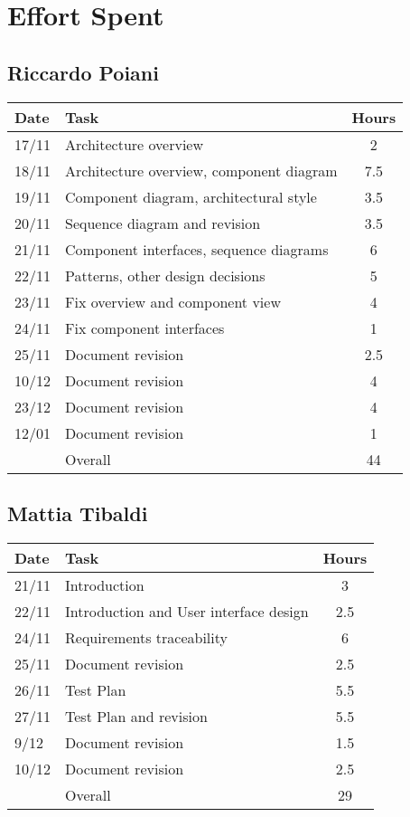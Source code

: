 \section{Effort Spent}

\subsection{Riccardo Poiani}

\begin{table}[H]
\begin{tabularx}{\textwidth}{|l|X|c|}
\hline
\rowcolor[HTML]{C0C0C0} 
Date & Task & Hours\\ \hline
17/11 & Architecture overview & 2\\ \hline
18/11 & Architecture overview, component diagram & 7.5 \\ \hline
19/11 & Component diagram, architectural style & 3.5\\ \hline
20/11 & Sequence diagram and revision & 3.5\\ \hline
21/11 & Component interfaces, sequence diagrams & 6\\ \hline
22/11 & Patterns, other design decisions & 5 \\ \hline
23/11 & Fix overview and component view & 4  \\  \hline
24/11 & Fix component interfaces & 1 \\ \hline
25/11 & Document revision & 2.5 \\ \hline
10/12 & Document revision & 4 \\ \hline
23/12 & Document revision & 4 \\ \hline
12/01 & Document revision & 1 \\ \hline
\rowcolor[HTML]{C0C0C0} 
& Overall & 44 \\ \hline
\end{tabularx}
\end{table}

\subsection{Mattia Tibaldi}

\begin{table}[H]
\begin{tabularx}{\textwidth}{|l|X|c|}
\hline
\rowcolor[HTML]{C0C0C0} 
Date & Task & Hours\\ \hline
21/11 & Introduction & 3 \\ \hline
22/11 & Introduction and User interface design & 2.5 \\ \hline
24/11 & Requirements traceability & 6 \\ \hline 
25/11 & Document revision & 2.5 \\ \hline
26/11 & Test Plan & 5.5\\ \hline
27/11 & Test Plan and revision & 5.5\\ \hline
9/12 & Document revision & 1.5\\ \hline
10/12 & Document revision & 2.5\\ \hline
\rowcolor[HTML]{C0C0C0} 
& Overall & 29\\ \hline
\end{tabularx}
\end{table}

